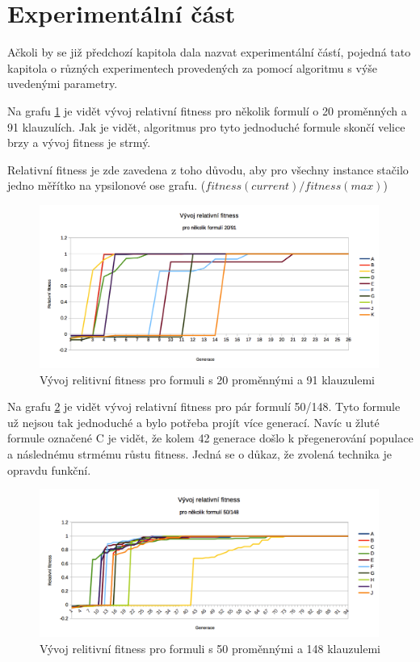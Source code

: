 \documentclass[a4paper]{article}
\begin{document}
\section{Experimentální část}
	Ačkoli by se již předchozí kapitola dala nazvat experimentální částí, pojedná tato kapitola o různých experimentech provedených za pomocí algoritmu s výše uvedenými parametry.
	
	Na grafu \ref{graf-vyvoj-20} je vidět vývoj relativní fitness pro několik formulí o 20 proměnných a 91 klauzulích. Jak je vidět, algoritmus pro tyto jednoduché formule skončí velice brzy a vývoj fitness je strmý.
	
	Relativní fitness je zde zavedena z toho důvodu, aby pro všechny instance stačilo jedno měřítko na ypsilonové ose grafu. ($fitness(current) / fitness(max)$)
	\begin{figure}[h]\centering
		\includegraphics[width=0.99\textwidth]{graf-vyvoj-20-91.png} 
		\caption{Vývoj relitivní fitness pro formuli s 20 proměnnými a 91 klauzulemi}
		\label{graf-vyvoj-20}
	\end{figure}
	
	Na grafu \ref{graf-vyvoj-50} je vidět vývoj relativní fitness pro pár formulí 50/148. Tyto formule už nejsou tak jednoduché a bylo potřeba projít více generací. Navíc u žluté formule označené C je vidět, že kolem 42 generace došlo k přegenerování populace a následnému strmému růstu fitness. Jedná se o důkaz, že zvolená technika je opravdu funkční.
	
	\begin{figure}[h]\centering
		\includegraphics[width=0.99\textwidth]{graf-vyvoj-50-148.png} 
		\caption{Vývoj relitivní fitness pro formuli s 50 proměnnými a 148 klauzulemi}
		\label{graf-vyvoj-50}
	\end{figure}
	
\end{document}
